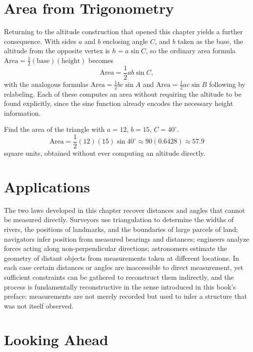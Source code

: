 \section{Area from Trigonometry}

Returning to the altitude construction that opened this chapter yields a
further consequence. With sides $a$ and $b$ enclosing angle $C$, and $b$
taken as the base, the altitude from the opposite vertex is $h = a\sin C$,
so the ordinary area formula $\text{Area} = \tfrac12(\text{base})(\text{height})$
becomes
\[
\boxed{\text{Area} = \frac12 ab\sin C},
\]
with the analogous formulas $\text{Area} = \tfrac12 bc\sin A$ and
$\text{Area} = \tfrac12 ac\sin B$ following by relabeling. Each of these
computes an area without requiring the altitude to be found explicitly,
since the sine function already encodes the necessary height information.

\begin{example}
Find the area of the triangle with $a = 12$, $b = 15$, $C = 40^\circ$.
\[
\text{Area} = \frac12(12)(15)\sin40^\circ \approx 90(0.6428) \approx 57.9
\]
square units, obtained without ever computing an altitude directly.
\end{example}

\section{Applications}

The two laws developed in this chapter recover distances and angles that
cannot be measured directly. Surveyors use triangulation to determine the
widths of rivers, the positions of landmarks, and the boundaries of large
parcels of land; navigators infer position from measured bearings and
distances; engineers analyze forces acting along non-perpendicular
directions; astronomers estimate the geometry of distant objects from
measurements taken at different locations. In each case certain distances
or angles are inaccessible to direct measurement, yet sufficient
constraints can be gathered to reconstruct them indirectly, and the
process is fundamentally reconstructive in the sense introduced in this
book's preface: measurements are not merely recorded but used to infer a
structure that was not itself observed.

\section{Looking Ahead}

